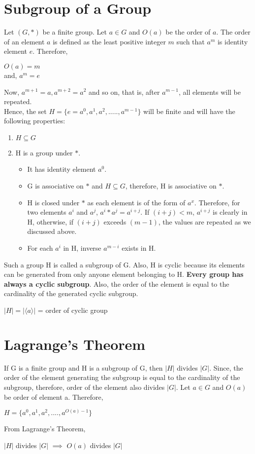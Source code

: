\documentclass[11pt]{article}
\begin{document}
\section{Subgroup of a Group}
Let $(G, *)$ be a finite group. Let $a \in G$ and $O(a)$ be the order of $a$. The order of an element $a$ is defined as the least positive integer $m$ such that $a^m$ is identity element $e$. Therefore,
\begin{center}
    $O(a) = m$\\
    and, $a^m = e$
\end{center}
Now, $a^{m+1} = a, a^{m+2} = a^2$ and so on, that is, after $a^{m-1}$, all elements will be repeated.\\
\newline
Hence, the set $H = \{e = a^0, a^1, a^2,....., a^{m-1}\}$ will be finite and will have the following properties:

\begin{enumerate}
    \item $H \subseteq G$
    \item H is a group under $*$.
    \begin{itemize}
        \item It has identity element $a^0$.
        \item G is associative on $*$ and $H \subseteq G$, therefore, H is associative on $*$.
        \item H is closed under $*$ as each element is of the form of $a^x$. Therefore, for two elements $a^i$ and $a^j$, $a^i * a^j = a^{i+j}$. If $(i + j) < m$, $a^{i+j}$ is clearly in H, otherwise, if $(i+j)$ exceeds $(m-1)$, the values are repeated as we discussed above.
        \item For each $a^i$ in H, inverse $a^{m-i}$ exists in H.
    \end{itemize}
\end{enumerate}
Such a group H is called a subgroup of G. Also, H is cyclic because its elements can be generated from only anyone element belonging to H. \textbf{Every group has always a cyclic subgroup}. Also, the order of the element is equal to the cardinality of the generated cyclic subgroup.
\begin{center}
    $|H| = |\langle a \rangle|$ = order of cyclic group
\end{center}

\section{Lagrange's Theorem}
If G is a finite group and H is a subgroup of G, then $|H|$ divides $|G|$. Since, the order of the element generating the subgroup is equal to the cardinality of the subgroup, therefore, order of the element also divides $|G|$. Let $a \in G$ and $O(a)$ be order of element a. Therefore, 
\begin{center}
    $H = \{a^0, a^1, a^2,....,a^{O(a)-1} \}$
\end{center}
From Lagrange's Theorem, 
\begin{center}
    $|H|$ divides $|G|$ $\implies$ $O(a)$ divides $|G|$
\end{center}
\end{document}
